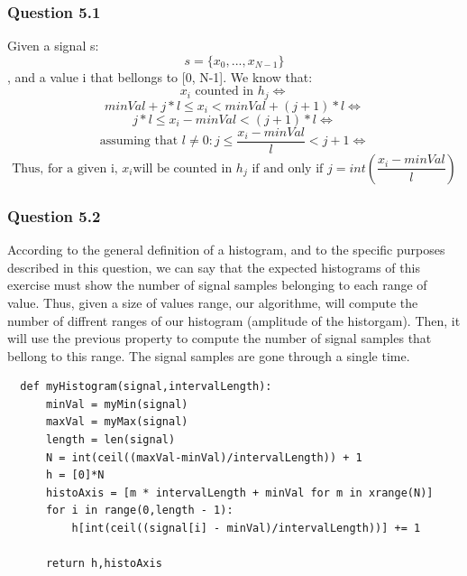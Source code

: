 \documentclass[a4paper,10pt]{article}
\begin{document}
	\subsubsection{Question 5.1 }
	    Given a signal s:
	    \begin{equation} s = \{ x_{0},...,x_{N−1}\}\end{equation}
	    , and a value i that bellongs to [0, N-1].  We know that: \newline
	    \begin{equation} x_{i}\mbox{ counted in }h_{j} \Leftrightarrow\end{equation}
	    \begin{equation} minVal + j*l \leq x_{i} < minVal + (j+1)*l \Leftrightarrow\end{equation}
	    \begin{equation} j*l \leq x_{i} - minVal < (j+1)*l \Leftrightarrow\end{equation}
	    \begin{equation} \mbox{assuming that } l \ne 0: j \leq \frac{x_{i} - minVal}{l} < j+1 \Leftrightarrow\end{equation}
	    \begin{equation} \mbox{Thus, for a given i, } x_{i} \mbox{will be counted in }h_{j}\mbox{ if and only if } j = int(\frac{x_{i} - minVal}{l})\end{equation}

	\subsubsection{Question 5.2 }
	According to the general definition of a histogram, and to the specific purposes described in this question, we can say 
	that the expected histograms of this exercise must show the number of signal samples belonging to each range of value.
	Thus, given a size of values range, our algorithme, will compute the number of diffrent ranges of our histogram (amplitude of the historgam).  
	Then, it will use the previous property to compute the number of signal samples that bellong to this range.   The signal samples are gone through a single time.
	
	\begin{lstlisting}
  def myHistogram(signal,intervalLength):
      minVal = myMin(signal)
      maxVal = myMax(signal)
      length = len(signal)
      N	= int(ceil((maxVal-minVal)/intervalLength)) + 1
      h = [0]*N
      histoAxis = [m * intervalLength + minVal for m in xrange(N)]
      for i in range(0,length - 1):
	      h[int(ceil((signal[i] - minVal)/intervalLength))] += 1

      return h,histoAxis
	 
	\end{lstlisting}
\end{document}
